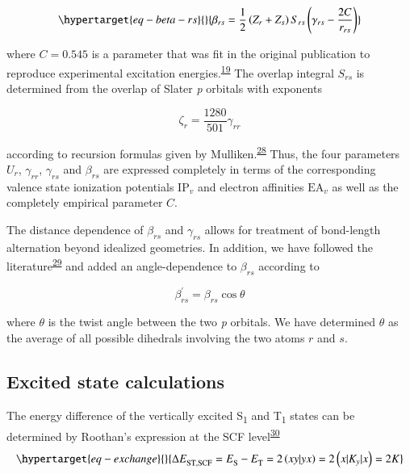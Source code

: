 \documentclass[
  number,
  3p]{elsarticle}
\newcommand{\E}[2][]{E^{\mathrm{#1}}_{\mathrm{#2}}}
\newcommand{\DeltaEST}[2][]{\Delta E^{\mathrm{#1}}_{\mathrm{ST,#2}}}
\begin{document}
\begin{equation}\protect\hypertarget{eq-beta-rs}{}{
\beta_{rs} = \frac{1}{2} \left( Z_r + Z_s \right) S_{rs} \left( \gamma_{rs} - \frac{2C}{r_{rs}} \right)
}\label{eq-beta-rs}\end{equation}

where \(C = 0.545\) is a parameter that was fit in the original
publication to reproduce experimental excitation
energies.\textsuperscript{\protect\hyperlink{ref-beveridgeParametrizationSemiempiricalPi1971}{19}}
The overlap integral \(S_{rs}\) is determined from the overlap of Slater
\emph{p} orbitals with exponents

\[
\zeta_r = \frac{1280}{501} \gamma_{rr}
\]

according to recursion formulas given by
Mulliken.\textsuperscript{\protect\hyperlink{ref-mullikenFormulasNumericalTables1949}{28}}
Thus, the four parameters \(U_{r}\), \(\gamma_{rr}\), \(\gamma_{rs}\)
and \(\beta_{rs}\) are expressed completely in terms of the
corresponding valence state ionization potentials \(\mathrm{IP}_v\) and
electron affinities \(\mathrm{EA}_v\) as well as the completely
empirical parameter \(C\).

The distance dependence of \(\beta_{rs}\) and \(\gamma_{rs}\) allows for
treatment of bond-length alternation beyond idealized geometries. In
addition, we have followed the
literature\textsuperscript{\protect\hyperlink{ref-murrellSemiempiricalSelfconsistentfieldMolecular1972}{29}}
and added an angle-dependence to \(\beta_{rs}\) according to

\[
\beta_{rs}^\prime = \beta_{rs} \cos{\theta}
\]

where \(\theta\) is the twist angle between the two \emph{p} orbitals.
We have determined \(\theta\) as the average of all possible dihedrals
involving the two atoms \(r\) and \(s\).

\hypertarget{excited-state-calculations}{%
\subsection{Excited state
calculations}\label{excited-state-calculations}}

The energy difference of the vertically excited S\textsubscript{1} and
T\textsubscript{1} states can be determined by Roothan's expression at
the SCF
level\textsuperscript{\protect\hyperlink{ref-roothaanNewDevelopmentsMolecular1951}{30}}
\begin{equation}\protect\hypertarget{eq-exchange}{}{
\DeltaEST{SCF} = \E{S} - \E{T} = 2 \left( xy \vert yx \right) = 2 \left( x \lvert K_y \rvert x \right) = 2K 
}\label{eq-exchange}\end{equation}
\end{document}
